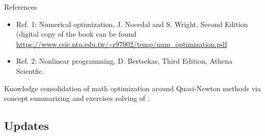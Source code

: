 \documentclass[a4paper,11pt]{article}
\numberwithin{equation}{section} %
\begin{document}
References
\begin{itemize}
 \item Ref. 1: Numerical optimization, J. Nocedal and S. Wright, Second Edition (digital copy of the book can be found \url{https://www.csie.ntu.edu.tw/~r97002/temp/num_optimization.pdf}
\item Ref. 2: Nonlinear programming, D. Bertsekas, Third Edition, Athena Scientfic.
\end{itemize}

Knowledge consolidation of math optimization around Quasi-Newton methods via concept summarizing and exercises solving of \cite{nocedal1999numerical, bertsekas1997nonlinear}.

\subsection{Updates}
\end{document}
